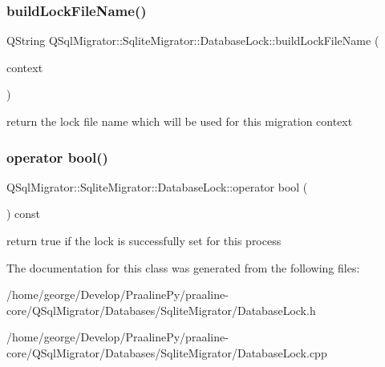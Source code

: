 \subsubsection{\texorpdfstring{build\+Lock\+File\+Name()}{buildLockFileName()}}
{\footnotesize\ttfamily Q\+String Q\+Sql\+Migrator\+::\+Sqlite\+Migrator\+::\+Database\+Lock\+::build\+Lock\+File\+Name (\begin{DoxyParamCaption}\item[{const \hyperlink{class_q_sql_migrator_1_1_migration_execution_1_1_migration_execution_context}{Migration\+Execution\+::\+Migration\+Execution\+Context} \&}]{context }\end{DoxyParamCaption})\hspace{0.3cm}{\ttfamily [static]}}

return the lock file name which will be used for this migration context \mbox{\label{class_q_sql_migrator_1_1_sqlite_migrator_1_1_database_lock_a42a41f79c57bea1253bea7794ad788ca}} 
\subsubsection{\texorpdfstring{operator bool()}{operator bool()}}
{\footnotesize\ttfamily Q\+Sql\+Migrator\+::\+Sqlite\+Migrator\+::\+Database\+Lock\+::operator bool (\begin{DoxyParamCaption}{ }\end{DoxyParamCaption}) const}

return true if the lock is successfully set for this process 

The documentation for this class was generated from the following files\+:\begin{DoxyCompactItemize}
\item 
/home/george/\+Develop/\+Praaline\+Py/praaline-\/core/\+Q\+Sql\+Migrator/\+Databases/\+Sqlite\+Migrator/Database\+Lock.\+h\item 
/home/george/\+Develop/\+Praaline\+Py/praaline-\/core/\+Q\+Sql\+Migrator/\+Databases/\+Sqlite\+Migrator/Database\+Lock.\+cpp\end{DoxyCompactItemize}
